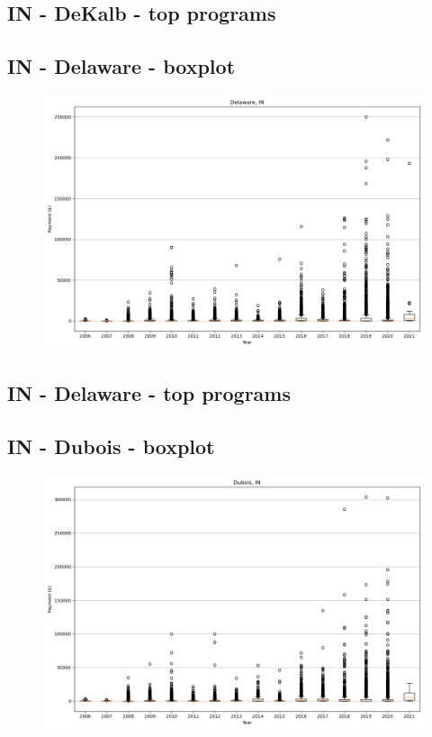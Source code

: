 \subsection*{IN - DeKalb - top programs}

\newpage
\subsection*{IN - Delaware - boxplot}
\begin{figure}[h]
\centering
\includegraphics[width=7in]{../output/boxplots/counties/Delaware-IN_boxplot.png}
\end{figure}


\subsection*{IN - Delaware - top programs}

\newpage
\subsection*{IN - Dubois - boxplot}
\begin{figure}[h]
\centering
\includegraphics[width=7in]{../output/boxplots/counties/Dubois-IN_boxplot.png}
\end{figure}


